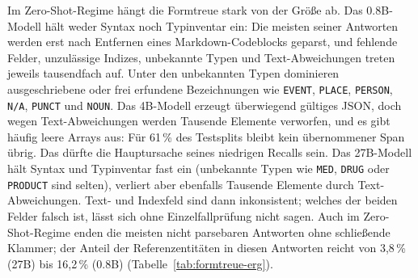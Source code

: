 Im Zero-Shot-Regime hängt die Formtreue stark von der Größe ab.
Das 0.8B-Modell hält weder Syntax noch Typinventar ein: Die meisten
seiner Antworten werden erst nach Entfernen eines Markdown-Codeblocks
geparst, und fehlende Felder, unzulässige Indizes, unbekannte Typen und
Text-Abweichungen treten jeweils tausendfach auf.
Unter den unbekannten Typen dominieren ausgeschriebene oder frei
erfundene Bezeichnungen wie \texttt{EVENT}, \texttt{PLACE},
\texttt{PERSON}, \texttt{N/A}, \texttt{PUNCT} und \texttt{NOUN}.
Das 4B-Modell erzeugt überwiegend gültiges JSON, doch wegen
Text-Abweichungen werden Tausende Elemente verworfen, und es gibt häufig
leere Arrays aus: Für
61\,\% des Testsplits bleibt kein übernommener Span übrig. Das dürfte
die Hauptursache seines niedrigen Recalls sein.
Das 27B-Modell hält Syntax und Typinventar fast ein (unbekannte Typen
wie \texttt{MED}, \texttt{DRUG} oder \texttt{PRODUCT} sind selten),
verliert aber ebenfalls Tausende Elemente durch Text-Abweichungen. Text- und
Indexfeld sind dann inkonsistent; welches der beiden Felder falsch ist,
lässt sich ohne Einzelfallprüfung nicht sagen.
Auch im Zero-Shot-Regime enden die meisten nicht parsebaren Antworten
ohne schließende Klammer; der Anteil der Referenzentitäten in diesen
Antworten reicht von 3,8\,\% (27B) bis 16,2\,\% (0.8B)
(Tabelle~\ref{tab:formtreue-erg}).

